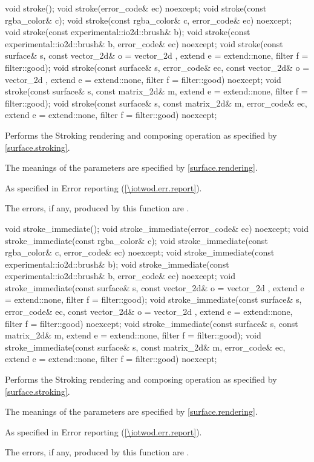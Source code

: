 \begin{itemdecl}
void stroke();
void stroke(error_code& ec) noexcept;
void stroke(const rgba_color& c);
void stroke(const rgba_color& c, error_code& ec) noexcept;
void stroke(const experimental::io2d::brush& b);
void stroke(const experimental::io2d::brush& b, error_code& ec) noexcept;
void stroke(const surface& s, const vector_2d& o = vector_2d{ },
  extend e = extend::none, filter f = filter::good);
void stroke(const surface& s, error_code& ec,
  const vector_2d& o = vector_2d{ },
  extend e = extend::none, filter f = filter::good) noexcept;
void stroke(const surface& s, const matrix_2d& m, extend e = extend::none,
  filter f = filter::good);
void stroke(const surface& s, const matrix_2d& m, error_code& ec,
  extend e = extend::none, filter f = filter::good) noexcept;
\end{itemdecl}
\begin{itemdescr}
\pnum
\effects
Performs the Stroking rendering and composing operation as specified by \ref{surface.stroking}.

\pnum
The meanings of the parameters are specified by \ref{surface.rendering}.

\pnum
\throws
As specified in Error reporting (\ref{\iotwod.err.report}).

\pnum
\errors
The errors, if any, produced by this function are .
\end{itemdescr}

\begin{itemdecl}
void stroke_immediate();
void stroke_immediate(error_code& ec) noexcept;
void stroke_immediate(const rgba_color& c);
void stroke_immediate(const rgba_color& c, error_code& ec) noexcept;
void stroke_immediate(const experimental::io2d::brush& b);
void stroke_immediate(const experimental::io2d::brush& b, error_code& ec)
  noexcept;
void stroke_immediate(const surface& s, const vector_2d& o = vector_2d{ },
  extend e = extend::none, filter f = filter::good);
void stroke_immediate(const surface& s, error_code& ec,
  const vector_2d& o = vector_2d{ }, extend e = extend::none,
  filter f = filter::good) noexcept;
void stroke_immediate(const surface& s, const matrix_2d& m,
  extend e = extend::none, filter f = filter::good);
void stroke_immediate(const surface& s, const matrix_2d& m, error_code& ec,
  extend e = extend::none, filter f = filter::good) noexcept;
\end{itemdecl}
\begin{itemdescr}
\pnum
\effects
Performs the Stroking rendering and composing operation as specified by \ref{surface.stroking}.

\pnum
The meanings of the parameters are specified by \ref{surface.rendering}.

\pnum
\throws
As specified in Error reporting (\ref{\iotwod.err.report}).

\pnum
\errors
The errors, if any, produced by this function are .
\end{itemdescr}

